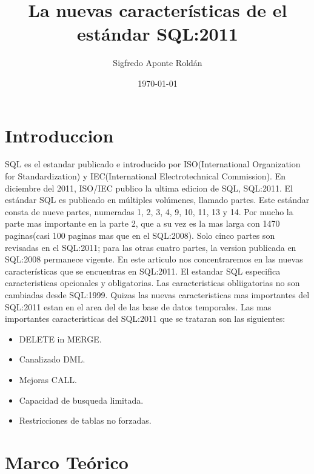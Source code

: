 \documentclass[twoside,twocolumn]{article}
\title{La nuevas características de el estándar SQL:2011} %
\author{Sigfredo Aponte Roldán}
\date{\today} %
\begin{document}
\maketitle


\section{Introduccion}
\lettrine[nindent=0em,lines=3]{S}QL es el estandar publicado e introducido por ISO(International Organization for Standardization) y IEC(International Electrotechnical Commission). En diciembre del 2011, ISO/IEC publico la ultima edicion de SQL, SQL:2011.
El estándar SQL es publicado en múltiples volúmenes, llamado partes. Este estándar consta de nueve partes, numeradas 1, 2, 3, 4, 9, 10, 11, 13 y 14. Por mucho la parte mas importante en la parte 2, que a su vez es la mas larga con 1470 paginas(casi 100 paginas mas que en el SQL:2008). Solo cinco partes son revisadas en el SQL:2011; para las otras cuatro partes, la version publicada en SQL:2008 permanece vigente. En este articulo nos concentraremos en las nuevas características que se encuentras en SQL:2011. El estandar SQL especifica caracteristicas opcionales y obligatorias. Las caracteristicas obliigatorias no son cambiadas desde SQL:1999. Quizas las nuevas caracteristicas mas importantes del SQL:2011 estan en el area del de las base de datos temporales. Las mas importantes caracteristicas del SQL:2011 que se trataran son las siguientes:
\begin{itemize}
\item DELETE in MERGE.
\item Canalizado DML.
\item Mejoras CALL.
\item Capacidad de busqueda limitada.
\item Restricciones de tablas no forzadas.

\end{itemize}



\section{Marco Teórico}
\end{document}
